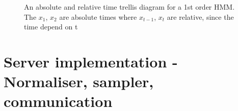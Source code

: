 \begin{frame}
\begin{figure}[htbp]
\caption[Absolute and relative time trellis diagram for an HMM]{An absolute and relative time trellis diagram for a 1st order HMM. The $x_{1}$, $x_{2}$ are absolute times where $x_{t-1}$, $x_{t}$ are relative, since the time depend on t}
\end{figure}\label{fig:4thMarkovModel}

\end{frame}
\section{Server implementation - Normaliser, sampler, communication}
